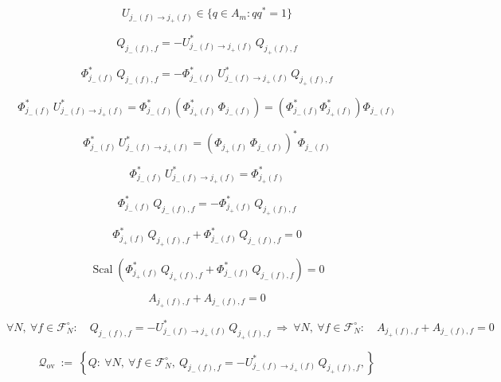 \documentclass[12pt]{article}
\begin{document}
\begin{equation}
U_{j_-(f)\to j_+(f)}\in\{q\in A_m:qq^*=1\}
\end{equation}

\begin{equation}
Q_{j_-(f),f}=-U_{j_-(f)\to j_+(f)}^*\,Q_{j_+(f),f}
\end{equation}

\begin{equation}
\Phi_{j_-(f)}^*\,Q_{j_-(f),f}=-\Phi_{j_-(f)}^*\,U_{j_-(f)\to j_+(f)}^*\,Q_{j_+(f),f}
\end{equation}

\begin{equation}
\Phi_{j_-(f)}^*\,U_{j_-(f)\to j_+(f)}^*=\Phi_{j_-(f)}^*(\Phi_{j_+(f)}^*\,\Phi_{j_-(f)})=(\Phi_{j_-(f)}^*\Phi_{j_+(f)}^*)\Phi_{j_-(f)}
\end{equation}

\begin{equation}
\Phi_{j_-(f)}^*\,U_{j_-(f)\to j_+(f)}^*=(\Phi_{j_+(f)}\,\Phi_{j_-(f)})^*\Phi_{j_-(f)}
\end{equation}

\begin{equation}
\Phi_{j_-(f)}^*\,U_{j_-(f)\to j_+(f)}^*=\Phi_{j_+(f)}^*
\end{equation}

\begin{equation}
\Phi_{j_-(f)}^*\,Q_{j_-(f),f}=-\Phi_{j_+(f)}^*\,Q_{j_+(f),f}
\end{equation}

\begin{equation}
\Phi_{j_+(f)}^*\,Q_{j_+(f),f}+\Phi_{j_-(f)}^*\,Q_{j_-(f),f}=0
\end{equation}

\begin{equation}
\operatorname{Scal}\!\left(\Phi_{j_+(f)}^*\,Q_{j_+(f),f}+\Phi_{j_-(f)}^*\,Q_{j_-(f),f}\right)=0
\end{equation}

\begin{equation}
A_{j_+(f),f}+A_{j_-(f),f}=0
\end{equation}

\begin{equation}
\forall N,\ \forall f\in\mathcal{F}_N^\circ:\quad Q_{j_-(f),f}=-U_{j_-(f)\to j_+(f)}^*\,Q_{j_+(f),f}
\ \Longrightarrow\
\forall N,\ \forall f\in\mathcal{F}_N^\circ:\quad A_{j_+(f),f}+A_{j_-(f),f}=0
\end{equation}

\begin{equation}
\mathcal{Q}_{\mathrm{ov}}\ :=\ \left\{Q:\ \forall N,\ \forall f\in\mathcal{F}_N^\circ,\ Q_{j_-(f),f}=-U_{j_-(f)\to j_+(f)}^*\,Q_{j_+(f),f},\right\}
\end{equation}
\end{document}
